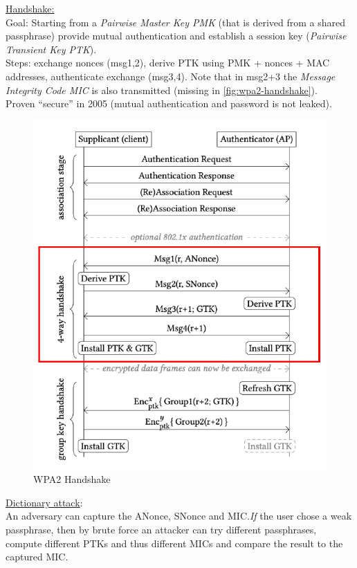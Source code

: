 \underline{Handshake:}\\
Goal: Starting from a \textit{Pairwise Master Key PMK} (that is derived from a shared passphrase) provide mutual authentication and establish a session key (\textit{Pairwise Transient Key PTK}).
\\
Steps: exchange nonces (msg1,2), derive PTK using PMK + nonces + MAC addresses, authenticate exchange (msg3,4).
Note that in msg2+3 the \textit{Message Integrity Code MIC} is also transmitted (missing in \autoref{fig:wpa2-handshake}).
\\
Proven ``secure'' in 2005 (mutual authentication and password is not leaked).

\begin{figure}[h]
	\centering
	\includegraphics[scale=0.6]{images/9-wpa2-handshake.png}
	\caption{WPA2 Handshake}%
	\label{fig:wpa2-handshake}
\end{figure}

\underline{Dictionary attack}: \\
An adversary can capture the ANonce, SNonce and MIC.\@ \textit{If} the user chose a weak passphrase, then by brute force an attacker can try different passphrases, compute different PTKs and thus different MICs and compare the result to the captured MIC.\@

